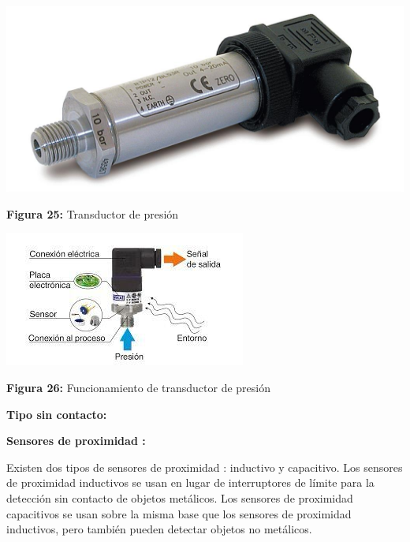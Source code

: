 \vspace{5mm}

\begin{center}
	\includegraphics[width=0.4\linewidth, height=0.2\textwidth]{img/transductorpresion}
	
	\vspace{2mm} %
	
	\textbf{Figura 25:} Transductor de presión
\end{center}

\vspace{5mm} %

\begin{center}
	\includegraphics[width=0.4\linewidth]{img/Stransmisordepresion}
	
	\vspace{2mm} %
	
	\textbf{Figura 26:} Funcionamiento de transductor de presión
\end{center}

\vspace{10mm}
\textbf{}
\textbf{Tipo sin contacto: }

\vspace{10mm}
\textbf{Sensores de proximidad : }

Existen dos tipos de sensores de proximidad : inductivo y capacitivo. Los sensores de proximidad inductivos se usan en lugar de interruptores de límite para la detección sin contacto de objetos metálicos. Los sensores de proximidad capacitivos se usan sobre la misma base que los sensores de proximidad inductivos, pero también pueden detectar objetos no metálicos.


\vspace{5mm}

